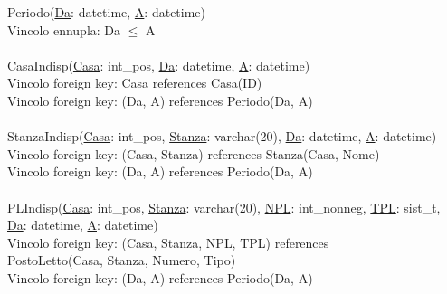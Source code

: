 \documentclass[a4paper,12pt]{report}
\begin{document}
      \hspace*{-0.75cm}
      Periodo(\underline{Da}: datetime, \underline{A}: datetime) \\
      \hspace*{1cm} Vincolo ennupla: Da $\leq$ A \\ \\

      \hspace*{-0.75cm}
      CasaIndisp(\underline{Casa}: int\_pos, \underline{Da}: datetime, \underline{A}: datetime) \\
      \hspace*{1cm} Vincolo foreign key: Casa references Casa(ID) \\
      \hspace*{1cm} Vincolo foreign key: (Da, A) references Periodo(Da, A) \\ \\

      \hspace*{-0.75cm}
      StanzaIndisp(\underline{Casa}: int\_pos, \underline{Stanza}: varchar(20), \underline{Da}: datetime, \underline{A}: datetime) \\
      \hspace*{1cm} Vincolo foreign key: (Casa, Stanza) references Stanza(Casa, Nome) \\
      \hspace*{1cm} Vincolo foreign key: (Da, A) references Periodo(Da, A) \\ \\

      \hspace*{-0.75cm}
      PLIndisp(\underline{Casa}: int\_pos, \underline{Stanza}: varchar(20), \underline{NPL}: int\_nonneg, \underline{TPL}: sist\_t, \\
      \hspace*{2cm}\underline{Da}: datetime, \underline{A}: datetime) \\
      \hspace*{1cm} Vincolo foreign key: (Casa, Stanza, NPL, TPL) references \\
      \hspace*{2cm}PostoLetto(Casa, Stanza, Numero, Tipo) \\
      \hspace*{1cm} Vincolo foreign key: (Da, A) references Periodo(Da, A) \\ \\
\end{document}

